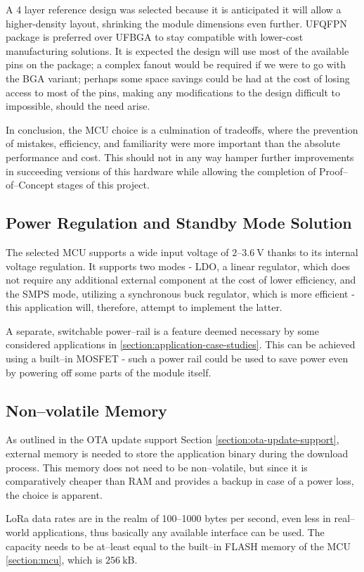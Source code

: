 A 4 layer reference design was selected because it is anticipated it will allow a higher-density layout, shrinking the module dimensions even further. UFQFPN package is preferred over UFBGA to stay compatible with lower-cost manufacturing solutions. It is expected the design will use most of the available pins on the package; a complex fanout would be required if we were to go with the BGA variant; perhaps some space savings could be had at the cost of losing access to most of the pins, making any modifications to the design difficult to impossible, should the need arise.

In conclusion, the MCU choice is a culmination of tradeoffs, where the prevention of mistakes, efficiency, and familiarity were more important than the absolute performance and cost. This should not in any way hamper further improvements in succeeding versions of this hardware while allowing the completion of Proof--of--Concept stages of this project. 

\subsection{Power Regulation and Standby Mode Solution}
The selected MCU supports a wide input voltage of $2\text{--}3.6~\mathrm{V}$ thanks to its internal voltage regulation. It supports two modes - LDO, a linear regulator, which does not require any additional external component at the cost of lower efficiency, and the SMPS mode, utilizing a synchronous buck regulator, which is more efficient - this application will, therefore, attempt to implement the latter.

A separate, switchable power--rail is a feature deemed necessary by some considered applications in \ref{section:application-case-studies}. This can be achieved using a built--in MOSFET - such a power rail could be used to save power even by powering off some parts of the module itself.

\subsection{Non--volatile Memory}
As outlined in the OTA update support Section \ref{section:ota-update-support}, external memory is needed to store the application binary during the download process. This memory does not need to be non--volatile, but since it is comparatively cheaper than RAM and provides a backup in case of a power loss, the choice is apparent.

LoRa data rates are in the realm of 100--1000 bytes per second, even less in real--world applications, thus basically any available interface can be used. The capacity needs to be at--least equal to the built--in FLASH memory of the MCU \ref{section:mcu}, which is $256~\mathrm{kB}$.

